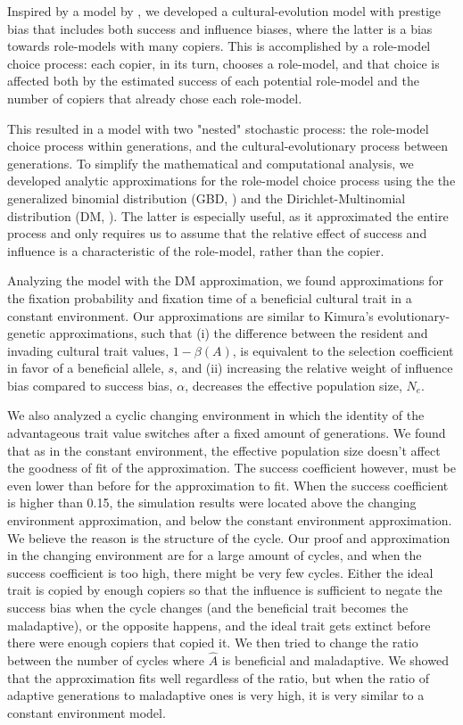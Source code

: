 \documentclass[12pt]{extarticle}
\begin{document}
Inspired by a model by \citet{evolutionBook}, we developed a cultural-evolution model with prestige bias that includes both success and influence biases, where the latter is a bias towards role-models with many copiers. This is accomplished by a role-model choice process: each copier, in its turn, chooses a role-model, and that choice is affected both by the estimated success of each potential role-model and the number of copiers that already chose each role-model. %

This resulted in a model with two "nested" stochastic process: the role-model choice process within generations, and the cultural-evolutionary process between generations. To simplify the mathematical and computational analysis, we developed analytic approximations for the role-model choice process using the the generalized binomial distribution (GBD, ) and the Dirichlet-Multinomial distribution (DM, ).
The latter is especially useful, as it approximated the entire process and only requires us to assume that the relative effect of success and influence is a characteristic of the role-model, rather than the copier. %

Analyzing the model with the DM approximation, we found approximations for the fixation probability and fixation time of a beneficial cultural trait in a constant environment.
Our approximations are similar to Kimura's evolutionary-genetic approximations, such that (i) the difference between the resident and invading cultural trait values, $1-\beta(A)$, is equivalent to the selection coefficient in favor of a beneficial allele, $s$, and (ii) increasing the relative weight of influence bias compared to success bias, $\alpha$, decreases the effective population size, $N_e$. %

We also analyzed a cyclic changing environment in which the identity of the advantageous trait value switches after a fixed amount of generations.
We found that as in the constant environment, the effective population size doesn't affect the goodness of fit of the approximation. The success coefficient however, must be even lower than before for the approximation to fit. When the success coefficient is higher than 0.15, the simulation results were located above the changing environment approximation, and below the constant environment approximation. We believe the reason is the structure of the cycle.
Our proof and approximation in the changing environment are for a large amount of cycles, and when the success coefficient is too high, there might be very few cycles. Either the ideal trait is copied by enough copiers so that the influence is sufficient to negate the success bias when the cycle changes (and the beneficial trait becomes the maladaptive), or the opposite happens, and the ideal trait gets extinct before there were enough copiers that copied it.
We then tried to change the ratio between the number of cycles where $\hat{A}$ is beneficial and maladaptive. We showed that the approximation fits well regardless of the ratio, but when the ratio of adaptive generations to maladaptive ones is very high, it is very similar to a constant environment model.
\end{document}

